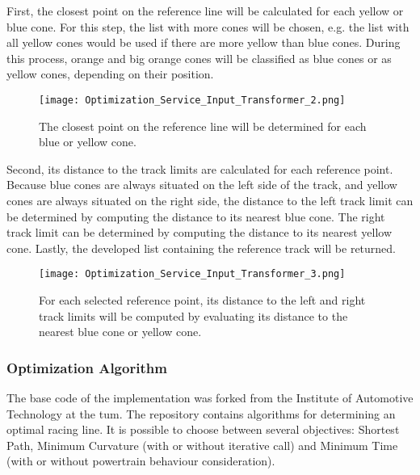 First, the closest point on the reference line will be calculated for each yellow or blue cone. For this step, the list with more cones will be chosen, e.g. the list with all yellow cones would be used if there are more yellow than blue cones. During this process, orange and big orange cones will be classified as blue cones or as yellow cones, depending on their position.
\begin{figure}[H]
    \centering
    \texttt{[image: Optimization\_Service\_Input\_Transformer\_2.png]}
    \caption{The closest point on the reference line will be determined for each blue or yellow cone.}
    \label{fig:Optimization Service Input Transformer 2}
\end{figure}

\pagebreak

Second, its distance to the track limits are calculated for each reference point. Because blue cones are always situated on the left side of the track, and yellow cones are always situated on the right side, the distance to the left track limit can be determined by computing the distance to its nearest blue cone. The right track limit can be determined by computing the distance to its nearest yellow cone. Lastly, the developed list containing the reference track will be returned.
\begin{figure}[H]
    \centering
    \texttt{[image: Optimization\_Service\_Input\_Transformer\_3.png]}
    \caption{For each selected reference point, its distance to the left and right track limits will be computed by evaluating its distance to the nearest blue cone or yellow cone.}
    \label{fig:Optimization Service Input Transformer 3}
\end{figure}

\subsubsection{Optimization Algorithm} \label{sec:Optimization Algorithm}
The base code of the implementation was forked from the Institute of Automotive Technology at the \acrlong{tum}.
The repository contains algorithms for determining an optimal racing line. It is possible to choose between several objectives: Shortest Path, Minimum Curvature (with or without iterative call) and Minimum Time (with or without powertrain behaviour consideration). \cite{tumftm_optimization_algoritm}

